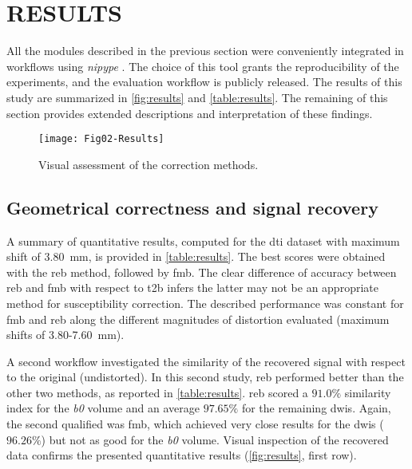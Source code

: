 \section{RESULTS}
\label{sec:results}

All the modules described in the previous section were
conveniently integrated in workflows using \emph{nipype}
\cite{gorgolewski_nipype:_2011}. The choice of this tool
grants the reproducibility of the experiments,
and the evaluation workflow is publicly released.
The results of this study are summarized
in \autoref{fig:results} and \autoref{table:results}.
The remaining of this section provides extended descriptions
and interpretation of these findings.

\begin{figure*}[tpb]
   \centering
   \texttt{[image: Fig02-Results]}
   \caption{Visual assessment of the correction methods.}
   \label{fig:results}
\end{figure*}


\subsection{Geometrical correctness and signal recovery}

A summary of quantitative results, computed for the \gls*{dti} 
dataset with maximum shift of 3.80~mm,
is provided in \autoref{table:results}.
The best scores were obtained with the \gls*{reb} 
method, followed by \gls*{fmb}. 
The clear difference of accuracy between \gls*{reb} and \gls*{fmb}
with respect to \gls*{t2b} infers the latter may not be
an appropriate method for susceptibility correction. 
The described performance was constant for \gls*{fmb} 
and \gls*{reb} along the different magnitudes of 
distortion evaluated (maximum shifts of 3.80-7.60~mm).





A second workflow investigated the similarity of the recovered
signal with respect to the original (undistorted).
In this second study, \gls*{reb} performed
better than the other two methods, as reported
in \autoref{table:results}. \gls*{reb} scored a $91.0\%$
similarity index for the \textit{b0} volume and an average $97.65\%$
for the remaining \glspl*{dwi}. Again, the second
qualified was \gls*{fmb}, which achieved very close results
for the \glspl*{dwi} ($96.26\%$) but not as good for the \textit{b0}
volume. Visual inspection of the recovered data confirms the 
presented quantitative results (\autoref{fig:results}, first row).



